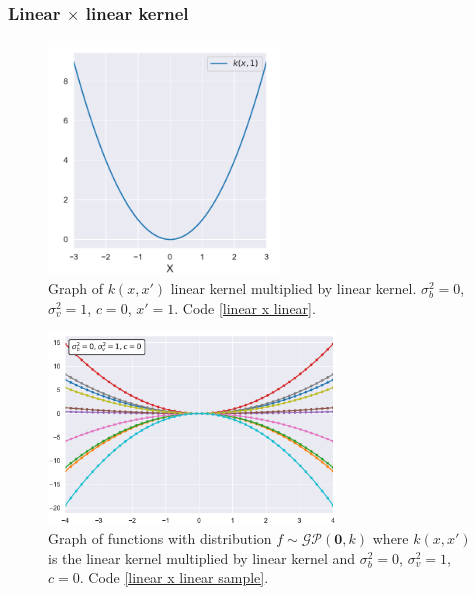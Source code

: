\subsubsection{Linear $\times$ linear kernel}

\begin{figure}[h]
    \centering
    \includegraphics[width=0.55\textwidth]{images/Gaussian process/Linear x Linear kernel.pdf}
    \caption{Graph of $k(x,x')$ linear kernel multiplied by linear kernel. $\sigma_b^2=0$, $\sigma_v^2=1$, $c=0$, $x'=1$. Code \ref{linear x linear}.}
    \label{linear * linear kernel}
\end{figure}


\begin{figure}[h]
    \centering
    \includegraphics[width=0.68\textwidth]{images/Gaussian process/linear x linear sample.pdf}
    \caption{Graph of functions with distribution  $f\sim \mathcal{GP}(\bm{0},k)$ where $k(x,x')$ is the linear kernel multiplied by linear kernel and $\sigma_b^2=0$, $\sigma_v^2=1$, $c=0$. Code \ref{linear x linear sample}.}
    \label{linear * linear sample}
\end{figure}


